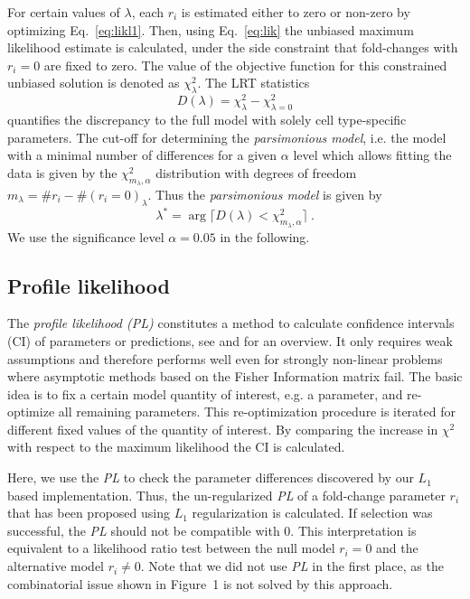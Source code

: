 \documentclass{bioinfo}
\begin{document}
For certain values of $\lambda$, each $r_i$ is estimated either to zero or non-zero by optimizing Eq.~\ref{eq:likl1}.
Then, using Eq.~\ref{eq:lik} the unbiased maximum likelihood estimate is calculated, under the side constraint that fold-changes with $r_i=0$ are fixed to zero.
The value of the objective function for this constrained unbiased solution is denoted as $\chi^2_\lambda$.
The LRT statistics
\begin{equation}
	D(\lambda) = \chi^2_\lambda - \chi^2_{\lambda=0}
\end{equation}
quantifies the discrepancy to the full model with solely cell type-specific parameters.
The cut-off for determining the \emph{parsimonious model}, i.e. the model with a minimal number of differences for a given $\alpha$ level which allows fitting the data is given by the $\chi^2_{m_\lambda,\alpha}$ distribution with degrees of freedom $m_\lambda=\#r_i - \#(r_i=0)_\lambda$.
Thus the \emph{parsimonious model} is given by
\begin{equation}
	\lambda^* = \arg \lceil D(\lambda) < \chi^2_{m_\lambda,\alpha} \rceil \:.
\end{equation}
We use the significance level $\alpha = 0.05$ in the following.

\subsection{Profile likelihood}
The \emph{profile likelihood (PL)} constitutes a method to calculate confidence intervals (CI) of parameters or predictions, see \cite{Raue2009} and \cite{Kreutz2012} for an overview.
It only requires weak assumptions and therefore performs well even for strongly non-linear problems where asymptotic methods based on the Fisher Information matrix fail.
The basic idea is to fix a certain model quantity of interest, e.g. a parameter, and re-optimize all remaining parameters. %
This re-optimization procedure is iterated for different fixed values of the quantity of interest.
By comparing the increase in $\chi^2$ with respect to the maximum likelihood the CI is calculated.

Here, we use the \emph{PL} to check the parameter differences discovered by our $L_1$ based implementation.
Thus, the un-regularized \emph{PL} of a fold-change parameter $r_i$ that has been proposed using $L_1$ regularization is calculated.
If selection was successful, the \emph{PL} should not be compatible with 0.
This interpretation is equivalent to a likelihood ratio test between the null model $r_i=0$ and the alternative model $r_i \neq 0$.
Note that we did not use \emph{PL} in the first place, as the combinatorial issue shown in Figure~1\vphantom{\ref{fig:01}} is not solved by this approach.
\end{document}
